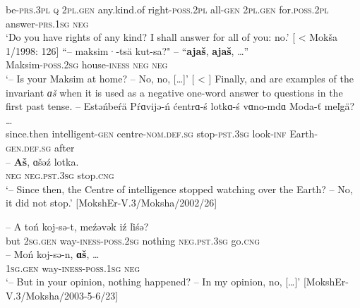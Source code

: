 \documentclass[output=paper,colorlinks,citecolor=brown,draft,draftmode]{langscibook}
\begin{document}
be-\textsc{prs.3pl} \textsc{q} 2\textsc{pl.gen} any.kind.of right-\textsc{poss.2pl} all-\textsc{gen} 2\textsc{pl.gen} for.\textsc{poss.2pl} answer-\textsc{prs.1sg} \textsc{neg}\\
\glt `Do you have rights of any kind? I shall answer for all of you: no.' [\citealt[270]{Hamari2007} < Mokša 1/1998: 126]
\z
\ea\label{ex:moksha-Maksim}
\gll ``-- maksim·-tsä kut-sa?" -- ``\textbf{ajaš}, \textbf{ajaš},
\ob\ldots\cb''\\
{} Maksim-\textsc{poss.2sg} house-\textsc{iness} {} \textsc{neg} \textsc{neg}\\
\glt `-- Is your Maksim at home? -- No, no, [\ldots]' [\citealt[270]{Hamari2007} < \citealt[894]{PaasonenRavila1947}]
\z
Finally,  and  are examples of the invariant \textit{ɑš} when it is used as a negative one-word answer to questions in the first past tense.
\ea\label{ex:moksha-intelligence}
\gll -- Estəńbeŕä Pŕɑvijə-ń ćentrɑ-ś lotkɑ-ś vɑno-mdɑ Moda-ť meľgä? \ob\ldots\cb\\
{} since.then intelligent-\textsc{gen} centre-\textsc{nom.def.sg} stop-\textsc{pst.3sg} look-\textsc{inf} Earth-\textsc{gen.def.sg} after {}\\
\sn
\gll -- \textbf{Aš}, ɑšəź lotka.\\
{} \textsc{neg} \textsc{neg.pst.3sg} stop.\textsc{cng}\\
\glt `-- Since then, the Centre of intelligence stopped watching over the Earth? -- No, it did not stop.' [MokshEr-V.3/Moksha/2002/26]
\z
\begin{exe}
\ex\label{ex:moksha-opinion}
\gll -- A toń koj-sə-t, meźəvək iź ľiśə?\\
{} but \textsc{2sg.gen} way-\textsc{iness-poss.2sg} nothing \textsc{neg.pst.3sg} go.\textsc{cng} \\
\sn
\gll -- Moń koj-sə-n, \textbf{ɑš}, \ob\ldots\cb\\
{} \textsc{1sg.gen} way-\textsc{iness-poss.1sg} \textsc{neg}\\
\glt `-- But in your opinion, nothing happened? -- In my opinion, no, [\ldots]' [MokshEr-V.3/Moksha/2003-5-6/23]
\end{exe}
\end{document}
